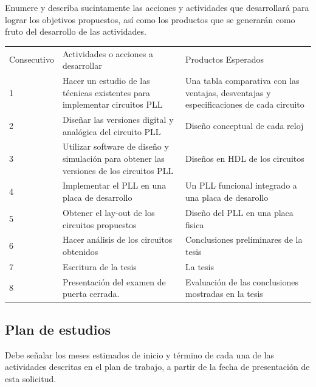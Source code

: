 \documentclass[runningheads,a4paper]{llncs}
\begin{document}
Enumere y describa sucintamente las acciones y actividades que desarrollará para lograr los objetivos propuestos, así como los productos que se generarán como fruto del desarrollo de las actividades. 
\begin{table}
\begin{center}
\begin{tabular}{|p{2cm}|p{5cm}|p{5cm}|} 
\hline\noalign{\smallskip}
Consecutivo & Actividades o acciones a desarrollar & Productos Esperados\\

\noalign{\smallskip}
\hline
\noalign{\smallskip}
1& Hacer un estudio de las técnicas existentes para implementar circuitos PLL & Una tabla comparativa con las ventajas, desventajas y especificaciones de cada circuito \\\hline
2&Diseñar las versiones digital y analógica del circuito PLL & Diseño conceptual de cada reloj \\\hline
3&Utilizar software de diseño y simulación para obtener las versiones de los circuitos PLL & Diseños en HDL de los circuitos\\\hline
4&Implementar el PLL en una placa de desarrollo & Un PLL funcional integrado a una placa de desarollo \\\hline
5&Obtener el lay-out de los circuitos propuestos & Diseño del PLL en una placa fisica \\\hline
6&Hacer análisis de los circuitos obtenidos & Conclusiones preliminares de la tesis\\\hline
7&Escritura de la tesis & La tesis \\\hline
8&Presentación del examen de puerta cerrada. & Evaluación de las conclusiones mostradas en la tesis \\\hline
\end{tabular}
\end{center}
\end{table}

\subsection{Plan de estudios }
Debe señalar los meses estimados de inicio y término de cada una de las actividades descritas en el plan de trabajo, a partir de la fecha de presentación de esta solicitud.
\end{document}
